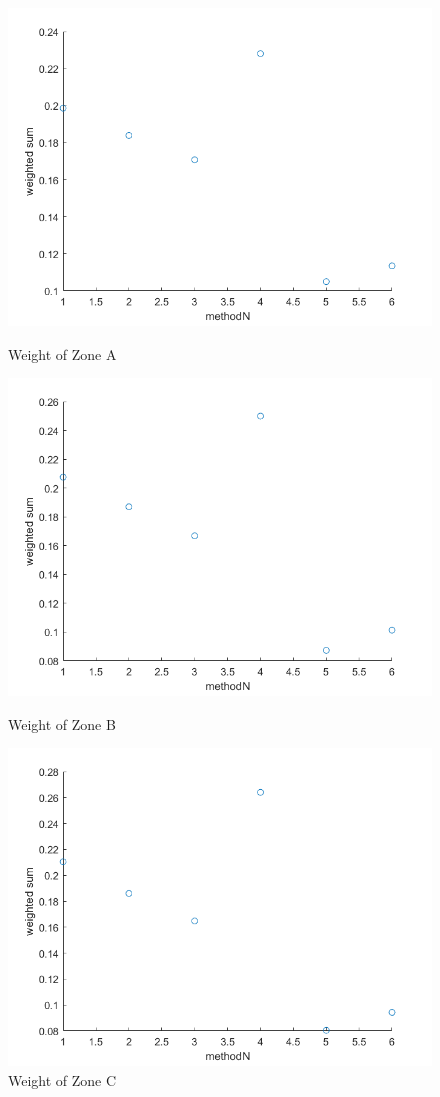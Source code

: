 \documentclass{mcmthesis}
\numberwithin{figure}{section}
\numberwithin{table}{section}
\numberwithin{equation}{section}
\begin{document}
\begin{figure}[htp]
	\centering
	\begin{minipage}[t]{0.33\linewidth}
	\centering
	\includegraphics[width=0.7\linewidth]{./figures/Q2a.png}
	\caption{Weight of Zone A}
	\label{F 6.1}
\end{minipage}\hfill
	\begin{minipage}[t]{0.33\linewidth}
\centering
\includegraphics[width=0.7\linewidth]{./figures/Q2b.png}
\caption{Weight of Zone B
		}
\label{F 6.2}
\end{minipage}\hfill
    \begin{minipage}[t]{0.33\linewidth}
	\centering
	\includegraphics[width=0.7\linewidth]{./figures/Q2c.png}
	\caption{Weight of Zone C
			 }
	\label{F 6.3}
	\end{minipage}\hfill
\end{figure}
\end{document}
